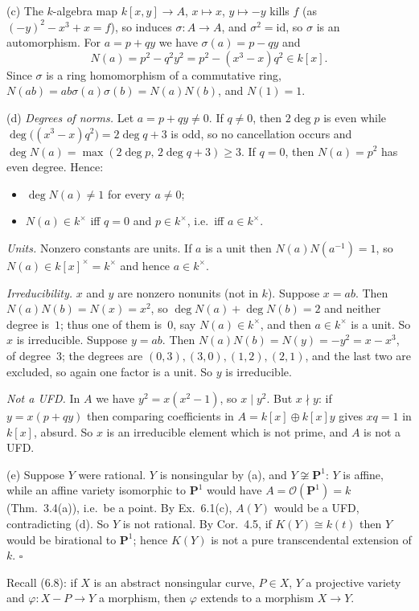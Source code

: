 \documentclass[11pt]{article}
\begin{document}
(c) The $k$-algebra map $k[x,y]\to A$, $x\mapsto x$, $y\mapsto-y$ kills $f$ (as $(-y)^2-x^3+x=f$), so induces $\sigma:A\to A$, and $\sigma^2=\mathrm{id}$, so $\sigma$ is an automorphism. For $a=p+qy$ we have $\sigma(a)=p-qy$ and
\[
N(a)=p^2-q^2y^2=p^2-(x^3-x)q^2\in k[x].
\]
Since $\sigma$ is a ring homomorphism of a commutative ring, $N(ab)=ab\sigma(a)\sigma(b)=N(a)N(b)$, and $N(1)=1$.

(d) \emph{Degrees of norms.} Let $a=p+qy\ne0$. If $q\ne0$, then $2\deg p$ is even while $\deg\big((x^3-x)q^2\big)=2\deg q+3$ is odd, so no cancellation occurs and $\deg N(a)=\max(2\deg p,\,2\deg q+3)\ge3$. If $q=0$, then $N(a)=p^2$ has even degree. Hence:
\begin{itemize}
\item $\deg N(a)\ne1$ for every $a\ne0$;
\item $N(a)\in k^\times$ iff $q=0$ and $p\in k^\times$, i.e.\ iff $a\in k^\times$.
\end{itemize}
\emph{Units.} Nonzero constants are units. If $a$ is a unit then $N(a)N(a^{-1})=1$, so $N(a)\in k[x]^\times=k^\times$ and hence $a\in k^\times$.

\emph{Irreducibility.} $x$ and $y$ are nonzero nonunits (not in $k$). Suppose $x=ab$. Then $N(a)N(b)=N(x)=x^2$, so $\deg N(a)+\deg N(b)=2$ and neither degree is~$1$; thus one of them is~$0$, say $N(a)\in k^\times$, and then $a\in k^\times$ is a unit. So $x$ is irreducible. Suppose $y=ab$. Then $N(a)N(b)=N(y)=-y^2=x-x^3$, of degree~$3$; the degrees are $(0,3),(3,0),(1,2),(2,1)$, and the last two are excluded, so again one factor is a unit. So $y$ is irreducible.

\emph{Not a UFD.} In $A$ we have $y^2=x(x^2-1)$, so $x\mid y^2$. But $x\nmid y$: if $y=x(p+qy)$ then comparing coefficients in $A=k[x]\oplus k[x]y$ gives $xq=1$ in $k[x]$, absurd. So $x$ is an irreducible element which is not prime, and $A$ is not a UFD.

(e) Suppose $Y$ were rational. $Y$ is nonsingular by (a), and $Y\not\cong\mathbf P^1$: $Y$ is affine, while an affine variety isomorphic to $\mathbf P^1$ would have $A=\mathcal O(\mathbf P^1)=k$ (Thm.~3.4(a)), i.e.\ be a point. By Ex.~6.1(c), $A(Y)$ would be a UFD, contradicting (d). So $Y$ is not rational. By Cor.~4.5, if $K(Y)\cong k(t)$ then $Y$ would be birational to $\mathbf P^1$; hence $K(Y)$ is not a pure transcendental extension of $k$. \hfill$\square$

\pf
Recall (6.8): if $X$ is an abstract nonsingular curve, $P\in X$, $Y$ a projective variety and $\varphi:X-P\to Y$ a morphism, then $\varphi$ extends to a morphism $X\to Y$.
\end{document}
